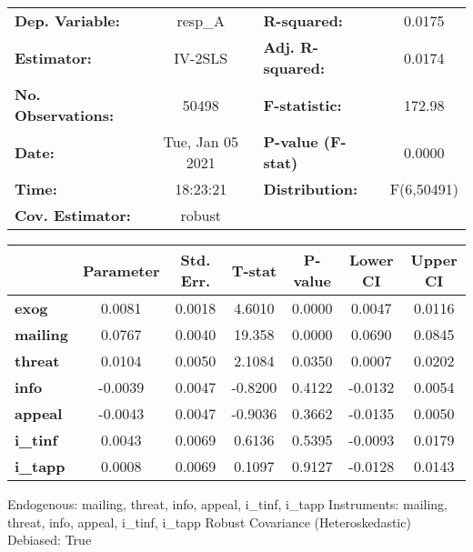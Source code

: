 \begin{center}
\begin{tabular}{lclc}
\toprule
\textbf{Dep. Variable:}    &      resp\_A       & \textbf{  R-squared:         } &      0.0175      \\
\textbf{Estimator:}        &      IV-2SLS       & \textbf{  Adj. R-squared:    } &      0.0174      \\
\textbf{No. Observations:} &       50498        & \textbf{  F-statistic:       } &      172.98      \\
\textbf{Date:}             &  Tue, Jan 05 2021  & \textbf{  P-value (F-stat)   } &      0.0000      \\
\textbf{Time:}             &      18:23:21      & \textbf{  Distribution:      } &    F(6,50491)    \\
\textbf{Cov. Estimator:}   &       robust       & \textbf{                     } &                  \\
\bottomrule
\end{tabular}
\begin{tabular}{lcccccc}
                 & \textbf{Parameter} & \textbf{Std. Err.} & \textbf{T-stat} & \textbf{P-value} & \textbf{Lower CI} & \textbf{Upper CI}  \\
\midrule
\textbf{exog}    &       0.0081       &       0.0018       &      4.6010     &      0.0000      &       0.0047      &       0.0116       \\
\textbf{mailing} &       0.0767       &       0.0040       &      19.358     &      0.0000      &       0.0690      &       0.0845       \\
\textbf{threat}  &       0.0104       &       0.0050       &      2.1084     &      0.0350      &       0.0007      &       0.0202       \\
\textbf{info}    &      -0.0039       &       0.0047       &     -0.8200     &      0.4122      &      -0.0132      &       0.0054       \\
\textbf{appeal}  &      -0.0043       &       0.0047       &     -0.9036     &      0.3662      &      -0.0135      &       0.0050       \\
\textbf{i\_tinf} &       0.0043       &       0.0069       &      0.6136     &      0.5395      &      -0.0093      &       0.0179       \\
\textbf{i\_tapp} &       0.0008       &       0.0069       &      0.1097     &      0.9127      &      -0.0128      &       0.0143       \\
\bottomrule
\end{tabular}
\end{center}

Endogenous: mailing, threat, info, appeal, i_tinf, i_tapp \newline
 Instruments: mailing, threat, info, appeal, i_tinf, i_tapp \newline
 Robust Covariance (Heteroskedastic) \newline
 Debiased: True
